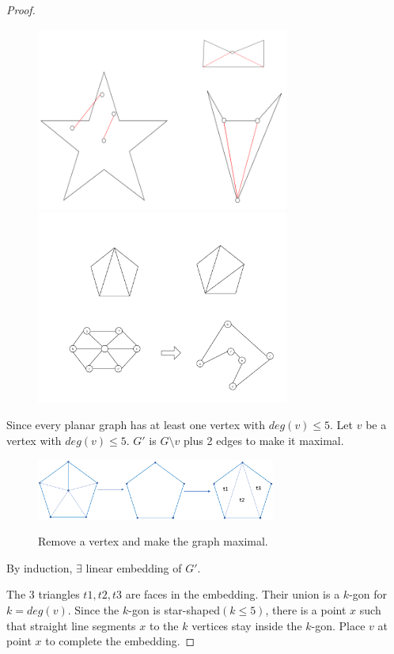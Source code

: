 \documentclass{article}
\begin{document}
\begin{proof}
  \begin{figure}[htp]
    \centering %
    \includegraphics[width = 8.3cm]{week8/figure/5-gons1.jpg}
    \includegraphics[width = 8.3cm]{week8/figure/5-gons2.jpg}
  \end{figure}
    
    Since every planar graph has at least one vertex with \(deg(v)\leq 5 \).
    Let \(v\) be a vertex with \(deg(v)\leq 5 \). \(G'\) is \(G\setminus v\) plus 2 edges to make it maximal. 
    \begin{figure}[!h]
      \centering
      {\includegraphics[width=0.7\textwidth]{figure/pentagon.png}}
      \caption{Remove a vertex and make the graph maximal.}
      \label{pentagon}
    \end{figure}
    By induction, \(\exists\) linear embedding of \(G'\).
    
    
    The 3 triangles \(t1, t2, t3\) are faces in the embedding. Their union is a \(k\)-gon for \(k = deg(v)\). Since the \(k\)-gon is star-shaped\((k\leq 5)\), there is a point \(x\) such that straight line segments \(x\) to the \(k\) vertices stay inside the \(k\)-gon. Place \(v\) at point \(x\) to complete the embedding.
    \end{proof}
\end{document}
